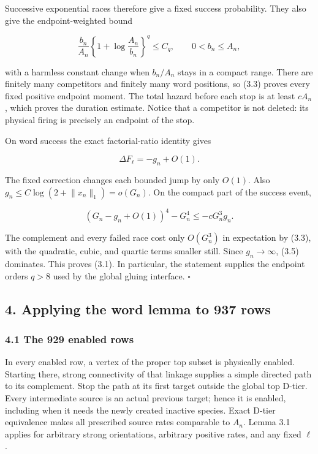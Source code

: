 Successive exponential races therefore give a fixed success probability.
They also give the endpoint-weighted bound

\[
 \frac{b_n}{A_n}
 \left\{1+\log\frac{A_n}{b_n}\right\}^{q}\le C_q,
 \qquad 0<b_n\le A_n,                                \tag{3.3}
\]

with a harmless constant change when \(b_n/A_n\) stays in a compact
range. There are finitely many competitors and finitely many word
positions, so (3.3) proves every fixed positive endpoint moment. The
total hazard before each stop is at least \(cA_n\), which proves the
duration estimate. Notice that a competitor is not deleted: its physical
firing is precisely an endpoint of the stop.

On word success the exact factorial-ratio identity gives

\[
 \Delta F_\ell=-g_n+O(1).                             \tag{3.4}
\]

The fixed correction changes each bounded jump by only \(O(1)\). Also
\(g_n\le C\log(2+\lVert x_n\rVert_1)=o(G_n)\). On the compact part of
the success event,

\[
 (G_n-g_n+O(1))^4-G_n^4\le-cG_n^3g_n.                \tag{3.5}
\]

The complement and every failed race cost only \(O(G_n^3)\) in
expectation by (3.3), with the quadratic, cubic, and quartic terms
smaller still. Since \(g_n\to\infty\), (3.5) dominates. This proves
(3.1). In particular, the statement supplies the endpoint orders \(q>8\)
used by the global gluing interface. \(\square\)

\subsection{4. Applying the word lemma to 937
rows}

\subsubsection{4.1 The 929 enabled rows}

In every enabled row, a vertex of the proper top subset is physically
enabled. Starting there, strong connectivity of that linkage supplies a
simple directed path to its complement. Stop the path at its first
target outside the global top D-tier. Every intermediate source is an
actual previous target; hence it is enabled, including when it needs the
newly created inactive species. Exact D-tier equivalence makes all
prescribed source rates comparable to \(A_n\). Lemma 3.1 applies for
arbitrary strong orientations, arbitrary positive rates, and any fixed
\(\ell\).

